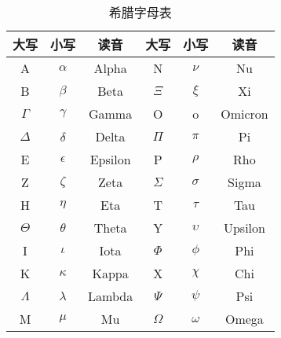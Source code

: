 \begin{table}[htbp]
    \centering
    \begin{tabular}{|c|c|c||c|c|c|}
        \hline
        大写 & 小写 & 读音 & 大写 & 小写 & 读音 \\
        \hline
        A         & $\alpha$    & Alpha &      N         & $\nu$         & Nu \\
        B         & $\beta$     & Beta &       $\Xi$         & $\xi$         & Xi \\
        $\Gamma$  & $\gamma$    & Gamma &      O    & o    & Omicron \\
        $\Delta$  & $\delta$    & Delta &      $\Pi$         & $\pi$         & Pi \\
        E         & $\epsilon$  & Epsilon &    P        & $\rho$        & Rho \\
        Z         & $\zeta$     & Zeta &       $\Sigma$      & $\sigma$      & Sigma \\
        H         & $\eta$      & Eta &        T        & $\tau$        & Tau \\
        $\Theta$  & $\theta$    & Theta &      Y    & $\upsilon$    & Upsilon \\
        I         & $\iota$     & Iota &       $\Phi$        & $\phi$        & Phi \\
        K         & $\kappa$    & Kappa &      X        & $\chi$        & Chi \\
        $\Lambda$ & $\lambda$   & Lambda &     $\Psi$        & $\psi$        & Psi \\
        M         & $\mu$       & Mu &         $\Omega$      & $\omega$      & Omega \\
        \hline
    \end{tabular}
    \caption{希腊字母表}
    \label{tab:greek-alphabet}
\end{table}
